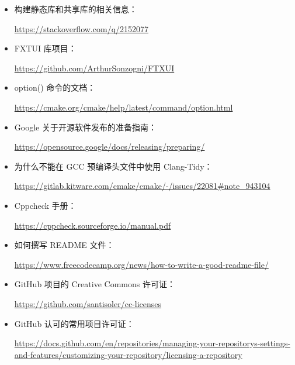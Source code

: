 
\begin{itemize}
\item
构建静态库和共享库的相关信息：

\url{https://stackoverflow.com/q/2152077}

\item
FXTUI 库项目：

\url{https://github.com/ArthurSonzogni/FTXUI}

\item
option() 命令的文档：

\url{https://cmake.org/cmake/help/latest/command/option.html}

\item
Google 关于开源软件发布的准备指南：

\url{https://opensource.google/docs/releasing/preparing/}

\item
为什么不能在 GCC 预编译头文件中使用 Clang-Tidy：

\url{https://gitlab.kitware.com/cmake/cmake/-/issues/22081#note_943104}

\item
Cppcheck 手册：

\url{https://cppcheck.sourceforge.io/manual.pdf}

\item
如何撰写 README 文件：

\url{https://www.freecodecamp.org/news/how-to-write-a-good-readme-file/}

\item
GitHub 项目的 Creative Commons 许可证：

\url{https://github.com/santisoler/cc-licenses}

\item
GitHub 认可的常用项目许可证：

\url{https://docs.github.com/en/repositories/managing-your-repositorys-settings-and-features/customizing-your-repository/licensing-a-repository}
\end{itemize}

